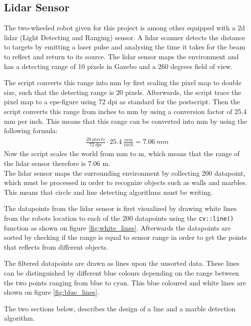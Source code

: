 \documentclass[../Head/Main.tex]{subfiles}
\begin{document}
\subsection{Lidar Sensor}
The two-wheeled robot given for this project is among other equipped with a 2d lidar (Light Detecting and Ranging) sensor. A lidar scanner detects the distance to targets by emitting a laser pulse and analysing the time it takes for the beam to reflect and return to its source. The lidar sensor maps the environment and has a detecting range of 10 pixels in Gazebo and a 260 degrees field of view. \par
The script converts this range into mm by first scaling the pixel map to double size, such that the detecting range is 20 pixels. Afterwards, the script trace the pixel map to a eps-figure using 72 dpi as standard for the postscript. Then the script converts this range from inches to mm by using a conversion factor of 25.4 mm per inch. This means that this range can be converted into mm by using the following formula:
\begin{align*}
\frac{20~pixels}{72~dpi}\cdot 25.4~\frac{mm}{inch} = 7.06~mm
\end{align*}
Now the script scales the world from mm to m, which means that the range of the lidar sensor therefore is 7.06 m.\\
The lidar sensor maps the surrounding environment by collecting 200 datapoint, which must be processed in order to recognize objects such as walls and marbles. This means that circle and line detecting algorithms must be writing. \par
The datapoints from the lidar sensor is first visualized by drawing white lines from the robots location to each of the 200 datapoints using the \texttt{cv::line()} function as shown on figure \ref{fig:white_lines}. Afterwards the datapoints are sorted by checking if the range is equal to sensor range in order to get the points that reflects from different objects.\par
The filtered datapoints are drawn as lines upon the unsorted data. These lines can be distinguished by different blue colours depending on the range between the two points ranging from blue to cyan. This blue coloured and white lines are shown on figure \ref{fig:blue_lines}.

The two sections below, describes the design of a line and a marble detection algorithm.


\end{document}
